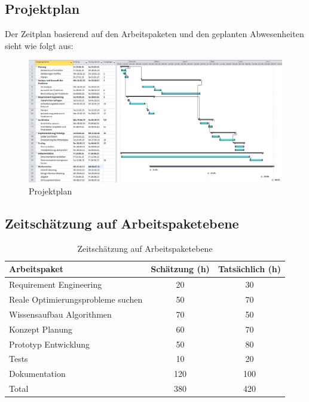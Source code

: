 \begin{landscape}
\thispagestyle{empty}
\subsection{Projektplan}\label{projektplan}
Der Zeitplan basierend auf den Arbeitspaketen und den geplanten Abwesenheiten sieht wie folgt aus:
\begin{figure}[h]
\centering
\includegraphics[scale=0.5]{images/project/projectplan.png}
\caption[Projektplan]{Projektplan \selfmade{}}
\label{fig:psp}
\end{figure}

\end{landscape}

\subsection{Zeitschätzung auf Arbeitspaketebene}
\begin{table}[ht]
\centering
  \begin{tabular}{ l | c | c }
	\hline
	\rowcolor{gray}
	\textbf{Arbeitspaket}					&	\textbf{Schätzung (h)}	& \textbf{Tatsächlich (h)}	\\ \hline
	Requirement Engineering					&	20			& 30	\\ \hline
	Reale Optimierungsprobleme suchen			&	50			& 70	\\ \hline
	Wissensaufbau Algorithmen				&	70			& 50	\\ \hline
	Konzept Planung						&	60			& 70	\\ \hline
	Prototyp Entwicklung					&	50			& 80	\\ \hline
	Tests								&	10			& 20	\\ \hline
	Dokumentation						&	120			& 100	\\ \hline \hline
	Total								&	380			& 420	\\ \hline
  \end{tabular}
   \caption{Zeitschätzung auf Arbeitspaketebene}\label{table:time_estimation}
\end{table}

